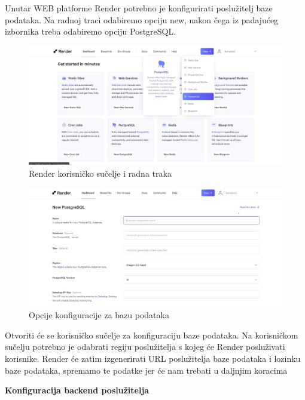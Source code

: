 			 Unutar WEB platforme Render potrebno je konfigurirati poslužitelj baze podataka. Na radnoj traci odabiremo opciju new, nakon čega iz padajućeg izbornika treba odabiremo opciju PostgreSQL.
			 
			 
			 \begin{figure}[H]
			 	\includegraphics[scale=0.4]{slike/baza_odabir.jpeg} %
			 	\centering
			 	\caption{Render korisničko sučelje i radna traka}
			 	\label{fig:promjene}
			 \end{figure}
			 
			 \begin{figure}[H]
			 	\includegraphics[scale=0.4]{slike/kofiguracija.jpeg} %
			 	\centering
			 	\caption{Opcije konfiguracije za bazu podataka}
			 	\label{fig:promjene}
			 \end{figure}
			 
			  Otvoriti će se korisničko sučelje za konfiguraciju baze podataka. Na korisničkom sučelju potrebno je odabrati regiju poslužitelja s kojeg će Render posluživati korisnike. Render će zatim izgenerirati URL poslužitelja baze podataka i lozinku baze podataka, spremamo te podatke jer će nam trebati u daljnjim koracima  

			 \textbf{Konfiguracija backend poslužitelja}
			 
